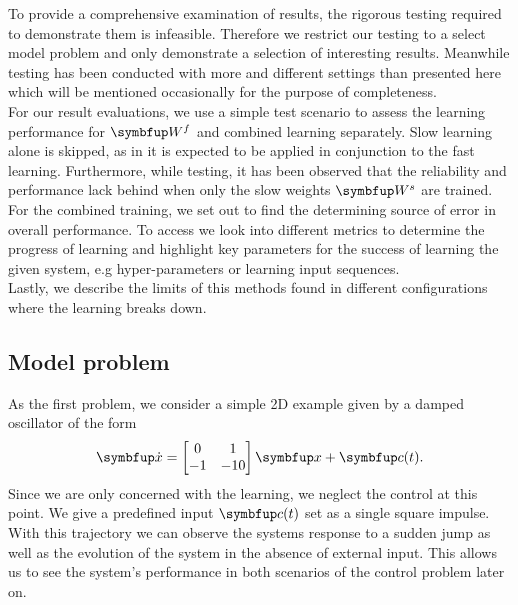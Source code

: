 To provide a comprehensive examination of results, the rigorous testing required to demonstrate them is infeasible. Therefore we restrict our testing to a select model problem and only demonstrate a selection of interesting results. Meanwhile testing has been conducted with more and different settings than presented here which will be mentioned occasionally for the purpose of completeness.\\
For our result evaluations, we use a simple test scenario to assess the learning performance for $\bmu{W}^f$ and combined learning separately. Slow learning alone is skipped, as in \cite{bourdoukan_enforcing_2015} it is expected to be applied in conjunction to the fast learning. Furthermore, while testing, it has been observed that the reliability and performance lack behind when only the slow weights $\bmu{W}^s$ are trained.\\
For the combined training, we set out to find the determining source of error in overall performance. To access we look into different metrics to determine the progress of learning and highlight key parameters for the success of learning the given system, e.g hyper-parameters or learning input sequences.\\
Lastly, we describe the limits of this methods found in different configurations where the learning breaks down.

\subsection{Model problem}
As the first problem, we consider a simple 2D example given by a damped oscillator of the form
\begin{equation}\label{eq:toy_example}
	\bmu{\dot{x}} = \begin{bmatrix}
	0&1\\ -1 &-10
	\end{bmatrix}\bmu{x} + \bmu{c}(t).
\end{equation}
Since we are only concerned with the learning, we neglect the control at this point. We give a predefined input $\bmu{c}(t)$ set as a single square impulse. With this trajectory we can observe the systems response to a sudden jump as well as the evolution of the system in the absence of external input. This allows us to see the system's performance in both scenarios of the control problem later on.

